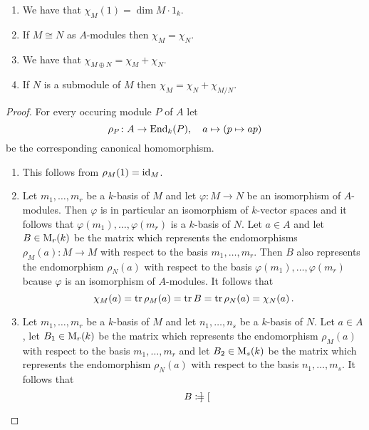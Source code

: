 \begin{lemma}
  \leavevmode
  \label{lemma: properties of general characters}
  \begin{enumerate}
    \item
      We have that $\chi_M(1) = \dim M \cdot 1_k$.
    \item
      If $M \cong N$ as $A$-modules then $\chi_M = \chi_N$.
    \item
      \label{enumerate: character of direct sum}
      We have that $\chi_{M \oplus N} = \chi_M + \chi_N$.
    \item
      \label{enumerate: character of quotient}
      If $N$ is a submodule of $M$ then $\chi_M = \chi_N + \chi_{M/N}$.
  \end{enumerate}
\end{lemma}
\begin{proof}
  For every occuring module $P$ of $A$ let
  \[
            \rho_P
    \colon  A
    \to     \operatorname{End}_k(P),
    \quad   a
    \mapsto (p \mapsto ap)
  \]
  be the corresponding canonical homomorphism.
  \begin{enumerate}
    \item
      This follows from $\rho_M(1) = \operatorname{id}_M$.
    \item
      Let $m_1, \dotsc, m_r$ be a $k$-basis of $M$ and let $\varphi \colon M \to N$ be an isomorphism of $A$-modules.
      Then $\varphi$ is in particular an isomorphism of $k$-vector spaces and it follows that $\varphi(m_1), \dotsc, \varphi(m_r)$ is a $k$-basis of $N$.
      Let $a \in A$ and let $B \in \operatorname{M}_r(k)$ be the matrix which represents the endomorphisms $\rho_M(a) \colon M \to M$ with respect to the basis $m_1, \dotsc, m_r$.
      Then $B$ also represents the endomorphism $\rho_N(a)$ with respect to the basis $\varphi(m_1), \dotsc, \varphi(m_r)$ bcause $\varphi$ is an isomorphism of $A$-modules.
      It follows that
      \[
          \chi_M(a)
        = \operatorname{tr} \rho_M(a)
        = \operatorname{tr} B
        = \operatorname{tr} \rho_N(a)
        = \chi_N(a) \,.
      \]
    \item
      Let $m_1, \dotsc, m_r$ be a $k$-basis of $M$ and let $n_1, \dotsc, n_s$ be a $k$-basis of $N$.
      Let $a \in A$, let $B_1 \in \operatorname{M}_r(k)$ be the matrix which represents the endomorphism $\rho_M(a)$ with respect to the basis $m_1, \dotsc, m_r$ and let $B_2 \in \operatorname{M}_s(k)$ be the matrix which represents the endomorphism $\rho_N(a)$ with respect to the basis $n_1, \dotsc, m_s$.
      It follows that
      \[
                  B
        \coloneqq  \begin{bmatrix}

\end{bmatrix}\]
\end{enumerate}
\end{proof}
